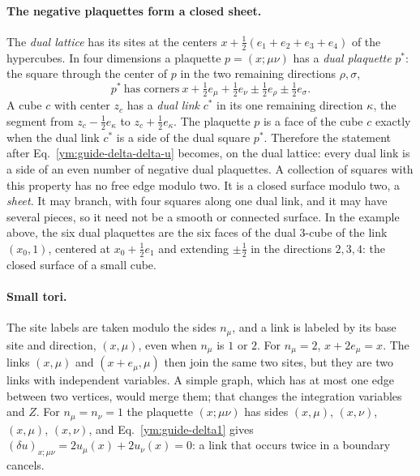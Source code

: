 \paragraph{The negative plaquettes form a closed sheet.}
The \emph{dual lattice} has its sites at the centers
$x+\frac12(e_1+e_2+e_3+e_4)$ of the hypercubes. In four dimensions a
plaquette $p=(x;\mu\nu)$ has a \emph{dual plaquette} $p^*$: the square
through the center of $p$ in the two remaining directions $\rho,\sigma$,
\begin{equation}\label{ym:guide-dual-plaquette}
 p^*\ \text{has corners}\
 x+\tfrac12e_\mu+\tfrac12e_\nu\pm\tfrac12e_\rho\pm\tfrac12e_\sigma .
\end{equation}
A cube $c$ with center $z_c$ has a \emph{dual link} $c^*$ in its one remaining
direction $\kappa$, the segment from $z_c-\frac12e_\kappa$ to
$z_c+\frac12e_\kappa$. The plaquette $p$ is a face of the cube $c$ exactly
when the dual link $c^*$ is a side of the dual square $p^*$. Therefore the
statement after Eq.~\eqref{ym:guide-delta-delta-u} becomes, on the dual
lattice: every dual link is a side of an even number of negative dual
plaquettes. A collection of squares with this property has no free edge
modulo two. It is a closed surface modulo two, a \emph{sheet}. It may
branch, with four squares along one dual link, and it may have several
pieces, so it need not be a smooth or connected surface. In the example
above, the six dual plaquettes are the six faces of the dual $3$-cube of
the link $(x_0,1)$, centered at $x_0+\frac12e_1$ and extending
$\pm\frac12$ in the directions $2,3,4$: the closed surface of a small cube.

\paragraph{Small tori.}
The site labels are taken modulo the sides $n_\mu$, and a link is labeled
by its base site and direction, $(x,\mu)$, even when $n_\mu$ is $1$ or $2$.
For $n_\mu=2$, $x+2e_\mu=x$. The links $(x,\mu)$ and $(x+e_\mu,\mu)$ then
join the same two sites, but they are two links with independent
variables. A simple graph, which has at most one edge between two
vertices, would merge them; that changes the integration variables and $Z$.
For $n_\mu=n_\nu=1$ the plaquette $(x;\mu\nu)$ has sides $(x,\mu)$,
$(x,\nu)$, $(x,\mu)$, $(x,\nu)$, and Eq.~\eqref{ym:guide-delta1} gives
$(\delta u)_{x;\mu\nu}=2u_\mu(x)+2u_\nu(x)=0$: a link that occurs twice in
a boundary cancels.

